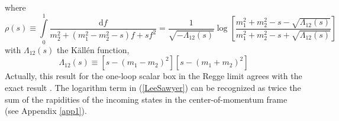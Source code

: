 where
\begin{equation}
	\rho(s) \equiv \int\limits_{0}^{1} \frac{\mathrm{d}f}{m_{2}^{2} + (m_{1}^{2} - m_{2}^{2} - s)f + s f^{2}} = \frac{1}{\sqrt{-\Lambda_{12}(s)}} \log{\left[ \frac{m_{1}^{2} + m_{2}^{2} - s - \sqrt{\Lambda_{12}(s)}}{m_{1}^{2} + m_{2}^{2} - s + \sqrt{\Lambda_{12}(s)}} \right]} \label{LeeSawyer}
\end{equation}
with $\Lambda_{12}(s)$ the K\"{a}ll\'{e}n function,
\begin{equation}
	\Lambda_{12}(s) \equiv [s - (m_{1} - m_{2})^{2}][s - (m_{1} + m_{2})^{2}]
\end{equation}
Actually, this result for the one-loop scalar box in the Regge limit agrees with the exact result \cite{PvN,tHVelt}. The logarithm term in (\ref{LeeSawyer}) can be recognized as twice the sum of the rapidities of the incoming states in the center-of-momentum frame (see Appendix \ref{app1}).

